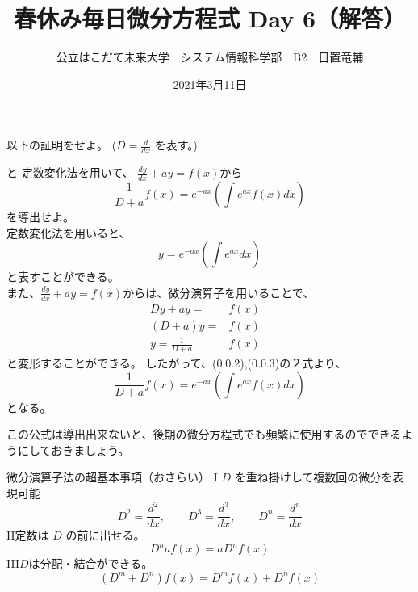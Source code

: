 \documentclass[dvipdfmx,uplatex]{jsarticle}
\title{春休み毎日微分方程式 Day 6（解答）}
\author{公立はこだて未来大学　システム情報科学部　B2　日置竜輔}
\date{2021年3月11日}
\begin{document}
\begin{spacing}{1.6}
\maketitle

以下の証明をせよ。 ($ \displaystyle D = \frac{d}{dx} $ を表す。)
\begin{qparts}
     と {\bm 定数変化法}を用いて、
    $ \displaystyle \frac{dy}{dx} + ay = f(x) から $
    \begin{equation}
      \frac{1}{D + a}f(x) = e ^ {-ax} \left(\int e ^ {ax} f(x) dx \right )
    \end{equation}を導出せよ。 \\
    定数変化法を用いると、
    \begin{equation}
      y = e ^ {-ax} \left( \int e^{ax}dx \right)
    \end{equation}
    と表すことができる。\\
    また、$ \displaystyle \frac{dy}{dx} + ay = f(x) から $は、微分演算子を用いることで、\\
    \begin{eqnarray}
      Dy + ay =  & f(x) & \nonumber \\
      (D + a)y = & f(x) & \nonumber \\
      y = \frac{1}{D + a} & f(x) &
      \end{eqnarray}
      と変形することができる。
    したがって、(0.0.2),(0.0.3)の２式より、\\
    \begin{equation*}
      \frac{1}{D + a}f(x) = e ^ {-ax} \left(\int e ^ {ax} f(x) dx \right )
    \end{equation*}
    となる。\\
  \end{qparts}
  この公式は導出出来ないと、後期の微分方程式でも頻繁に使用するのでできるようにしておきましょう。\\
  \begin{itembox}{微分演算子法の超基本事項（おさらい）}
    {\rm I} \quad $ D $ を重ね掛けして複数回の微分を表現可能 \\
    \begin{equation*}
      D^2 = \frac{d^2}{dx},\qquad D^3 = \frac{d ^ 3}{dx}, \qquad D ^ n = \frac{d^n}{dx}
    \end{equation*}
    {\rm II}\quad 定数は $ D $ の前に出せる。\\
    \begin{equation*}
      D^naf(x) = aD^nf(x)
    \end{equation*}
    {\rm III}\quad $ D $は分配・結合ができる。\\
    \begin{equation*}
      (D ^ m + D ^ n)f(x) = D^mf(x) + D^nf(x)
    \end{equation*}
  \end{itembox}
\end{spacing}
\end{document}
